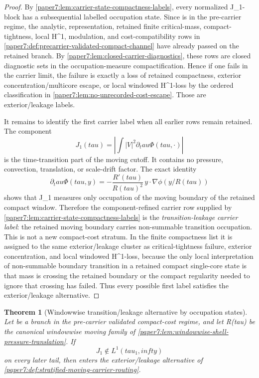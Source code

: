 \documentclass[11pt]{amsart}
\def\({}%
\def\){}%
\def\tau{tau}%
\def\infty{infty}%
\theoremstyle{plain}
\newtheorem{theorem}{Theorem}[section]
\theoremstyle{definition}
\theoremstyle{remark}
\begin{document}
\begin{proof}
By \cref{paper7:lem:carrier-state-compactness-labels}, every normalized
\(J_1\)-block has a subsequential labelled occupation state.  Since \(\omega\) is
in the pre-carrier regime, the analytic, representation, retained finite
critical-mass, compact-tightness, local \(H^1\), modulation, and cost-compatibility rows in
\cref{paper7:def:precarrier-validated-compact-channel} have already passed on
the retained branch.  By
\cref{paper7:lem:closed-carrier-diagnostics}, these rows are closed diagnostic
sets in the occupation-measure compactification.  Hence if one fails in the carrier
limit, the failure is exactly a loss of retained compactness, exterior
concentration/multicore escape, or local windowed \(H^1\)-loss by the ordered
classification in \cref{paper7:lem:no-unrecorded-cost-escape}.  Those are
exterior/leakage labels.
\par
It remains to identify the first carrier label when all earlier rows remain
retained.  The component
\[
  J_1(\tau)=\left|\int |V|^2\partial_\tau\Phi(\tau,\cdot)\right|
\]
is the time-transition part of the moving cutoff.  It contains no pressure,
convection, translation, or scale-drift factor.  The exact identity
\[
  \partial_\tau\Phi(\tau,y)
  =
  -\frac{R'(\tau)}{R(\tau)^2}\,y\cdot\nabla\phi(y/R(\tau))
\]
shows that \(J_1\) measures only occupation of the moving boundary of the
retained compact window.  Therefore the component-refined carrier row supplied
by \cref{paper7:lem:carrier-state-compactness-labels} is the
\emph{transition-leakage carrier label}: the retained moving boundary carries
non-summable transition occupation.  This is not a new compact-cost stratum.
In the finite compactness list it is assigned to the same exterior/leakage
cluster as critical-tightness failure, exterior concentration, and local
windowed \(H^1\)-loss, because the only local interpretation of non-summable
boundary transition in a retained compact single-core state is that mass is
crossing the retained boundary or the compact regularity needed to ignore that
crossing has failed.  Thus every possible first label satisfies the
exterior/leakage alternative.
\end{proof}

\begin{theorem}[Windowwise transition/leakage alternative by occupation states]
\label{paper7:thm:windowwise-transition-routing-certificate}
Let \(\omega\) be a branch in the pre-carrier validated compact-cost regime,
and let \(R(\tau)\) be the canonical windowwise moving family of
\cref{paper7:lem:windowwise-shell-pressure-translation}.  If
\[
  J_1\notin L^1(\tau_1,\infty)
\]
on every later tail, then \(\omega\) enters the exterior/leakage alternative
of \cref{paper7:def:stratified-moving-carrier-routing}.
\end{theorem}
\end{document}
